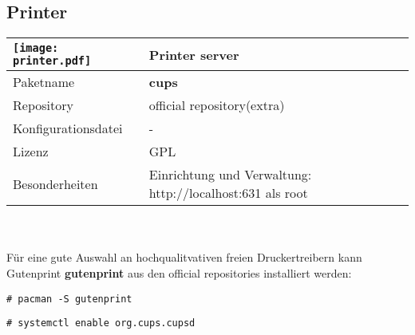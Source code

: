 \subsection{Printer}
\begin{tabular}{l|l}
\texttt{[image: printer.pdf]} & Printer server \\ \hline
Paketname & \textbf{cups} \\ 
Repository & official repository(extra) \\
Konfigurationsdatei & - \\
Lizenz & GPL \\
Besonderheiten & Einrichtung und Verwaltung: http://localhost:631 als root \\
\end{tabular}
\\ \\
Für eine gute Auswahl an hochqualitvativen freien Druckertreibern kann Gutenprint \textbf{gutenprint}
aus den official repositories installiert werden:
\begin{lstlisting}[style=Bash]
# pacman -S gutenprint 
\end{lstlisting}
\begin{lstlisting}[style=Bash]
# systemctl enable org.cups.cupsd 
\end{lstlisting}
